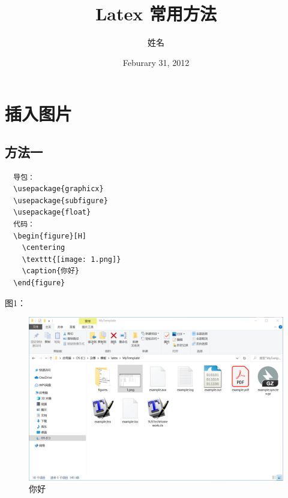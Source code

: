 \documentclass[onecolumn,oneside]{SUSTechHomework}
\begin{document}
\author{姓名}
\title{Latex 常用方法}
\date{Feburary 31, 2012}
\maketitle

\tableofcontents  

\section{插入图片}
\subsection{方法一}
\begin{lstlisting}
  导包：
  \usepackage{graphicx}
  \usepackage{subfigure}
  \usepackage{float}
  代码：
  \begin{figure}[H]
    \centering
    \texttt{[image: 1.png]}
    \caption{你好}
  \end{figure}
\end{lstlisting}
图1：
\begin{figure}[H]
  \centering
  \includegraphics[scale=0.2]{figures/1.png}
  \caption{你好}
\end{figure}
\end{document}
